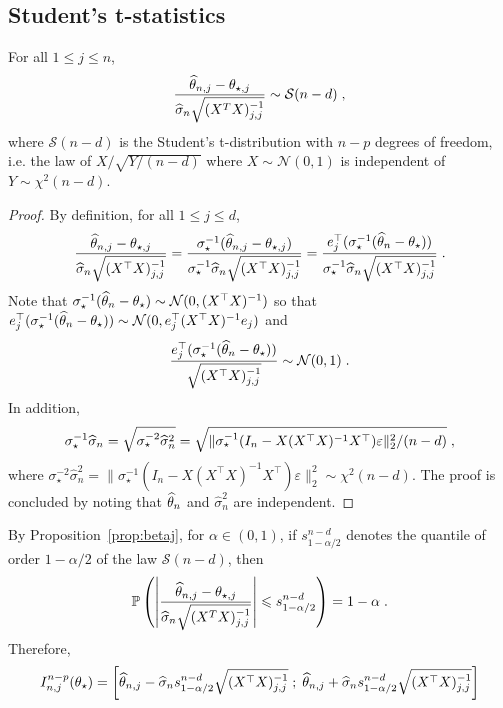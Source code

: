 \subsection*{Student's t-statistics}
\begin{shaded}
\begin{proposition}
\label{prop:betaj}
For all $1\leqslant j \leqslant n$,
\[
\frac{\widehat {\theta}_{n,j} -\theta_{\star,j}}{\widehat\sigma_{n}\sqrt{(X^TX)_{j,j}^{-1}}} \sim \mathcal{S}(n-d)\;,
\]
where $\mathcal{S}(n-d)$ is the Student's t-distribution with $n-p$ degrees of freedom, i.e. the law of $X/\sqrt{Y/(n-d)}$ where $X\sim\mathcal{N}(0,1)$ is independent of $Y\sim\chi^2(n-d)$.
\end{proposition}
\end{shaded}
\begin{proof}
By definition, for all $1\leqslant j \leqslant d$,  
\[
\frac{\widehat {\theta}_{n,j} -\theta_{\star,j}}{\widehat\sigma_{n}\sqrt{(X^\top X)_{j,j}^{-1}}} = \frac{\sigma_\star^{-1}(\widehat {\theta}_{n,j} -\theta_{\star,j})}{\sigma_\star^{-1}\widehat\sigma_{n}\sqrt{(X^\top X)_{j,j}^{-1}}} = \frac{e^\top_j(\sigma_\star^{-1}(\widehat {\theta}_{n} -\theta_{\star}))}{\sigma_\star^{-1}\widehat\sigma_{n}\sqrt{(X^\top X)_{j,j}^{-1}}}\;.
\]
Note that $\sigma_\star^{-1}(\widehat {\theta}_{n} -\theta_{\star}) \sim \mathcal{N}(0,(X^\top X)^{-1})$ so that $e^\top_j(\sigma_\star^{-1}(\widehat {\theta}_{n} -\theta_{\star}))\sim \mathcal{N}(0,e^\top_j(X^\top X)^{-1}e_j)$ and 
\[
\frac{e^\top_j(\sigma_\star^{-1}(\widehat {\theta}_{n} -\theta_{\star}))}{\sqrt{(X^\top X)_{j,j}^{-1}}}\sim\mathcal{N}(0,1)\;.
\]
In addition,
\[
\sigma_\star^{-1}\widehat\sigma_{n} = \sqrt{\sigma_\star^{-2}\widehat\sigma^2_{n}} = \sqrt{\|\sigma_\star^{-1}(I_n - X(X^\top X)^{-1}X^\top)\varepsilon\|_2^2/(n-d)}\;,
\]
where $\sigma_\star^{-2}\widehat\sigma^2_{n} = \|\sigma_\star^{-1}(I_n - X(X^\top X)^{-1}X^\top)\varepsilon\|_2^2 \sim \chi^2(n-d)$. The proof is concluded by noting that $\widehat {\theta}_n$ and  $\widehat\sigma^2_{n}$ are independent.
\end{proof}
By Proposition~\ref{prop:betaj}, for $\alpha\in(0,1)$, if $s_{1-\alpha/2}^{n-d}$ denotes the quantile of order $1-\alpha/2$ of the law $\mathcal{S}(n-d)$, then 
\[
\mathbb{P}\left(\left|\frac{\widehat {\theta}_{n,j} -\theta_{\star,j}}{\widehat\sigma_{n}\sqrt{(X^TX)_{j,j}^{-1}}}\right| \leqslant s_{1-\alpha/2}^{n-d}\right) = 1-\alpha\;.
\]
Therefore, 
\[
I^{n-p}_{n,j}(\theta_{\star}) = \left[\widehat {\theta}_{n,j} -\widehat\sigma_{n}s_{1-\alpha/2}^{n-d}\sqrt{(X^\top X)_{j,j}^{-1}}\;;\; \widehat {\theta}_{n,j} + \widehat\sigma_{n}s_{1-\alpha/2}^{n-d}\sqrt{(X^\top X)_{j,j}^{-1}}\right]
\]
